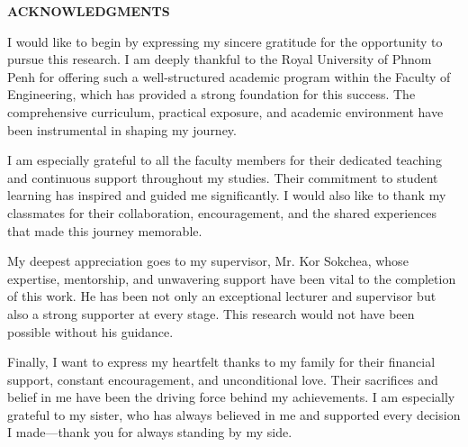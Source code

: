 \begin{adjustwidth}{0.2cm}{0.2cm}

    \begin{center}
        {\englishfont\fontsize{14pt}{21pt}\selectfont \textbf{ACKNOWLEDGMENTS} \par}
    \end{center}
    \label{acknowledgements}

    \vspace{1cm}
    \setlength{\parindent}{2em}
    {\large I would like to begin by expressing my sincere gratitude for the opportunity to pursue this research. I am deeply thankful to the Royal University of Phnom Penh for offering such a well-structured academic program within the Faculty of Engineering, which has provided a strong foundation for this success. The comprehensive curriculum, practical exposure, and academic environment have been instrumental in shaping my journey.

    \vspace{0.5cm}
    I am especially grateful to all the faculty members for their dedicated teaching and continuous support throughout my studies. Their commitment to student learning has inspired and guided me significantly. I would also like to thank my classmates for their collaboration, encouragement, and the shared experiences that made this journey memorable.

    \vspace{0.5cm}
    My deepest appreciation goes to my supervisor, Mr. Kor Sokchea, whose expertise, mentorship, and unwavering support have been vital to the completion of this work. He has been not only an exceptional lecturer and supervisor but also a strong supporter at every stage. This research would not have been possible without his guidance.

    \vspace{0.5cm}
    Finally, I want to express my heartfelt thanks to my family for their financial support, constant encouragement, and unconditional love. Their sacrifices and belief in me have been the driving force behind my achievements. I am especially grateful to my sister, who has always believed in me and supported every decision I made—thank you for always standing by my side.

    \par}

\end{adjustwidth}
